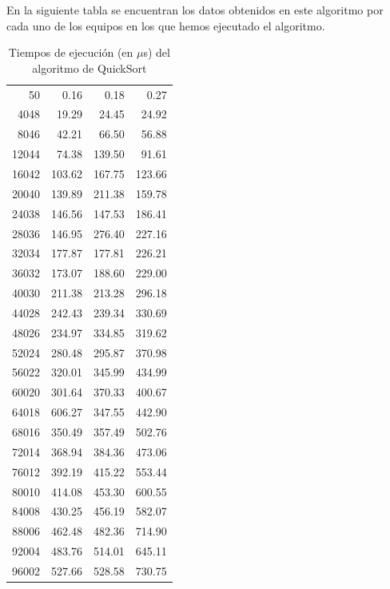 \documentclass{homework}
\begin{document}
    En la siguiente tabla se encuentran los datos obtenidos en este algoritmo por cada uno de los
    equipos en los que hemos ejecutado el algoritmo. 

    \begin{table}[h]
        \centering
            \begin{tabular}{|r|r|r|r|}
                50 & 0.16 & 0.18 & 0.27 \\ 
                4048 & 19.29 & 24.45 & 24.92 \\ 
                8046 & 42.21 & 66.50 & 56.88 \\ 
                12044 & 74.38 & 139.50 & 91.61 \\ 
                16042 & 103.62 & 167.75 & 123.66 \\ 
                20040 & 139.89 & 211.38 & 159.78 \\ 
                24038 & 146.56 & 147.53 & 186.41 \\ 
                28036 & 146.95 & 276.40 & 227.16 \\ 
                32034 & 177.87 & 177.81 & 226.21 \\ 
                36032 & 173.07 & 188.60 & 229.00 \\ 
                40030 & 211.38 & 213.28 & 296.18 \\ 
                44028 & 242.43 & 239.34 & 330.69 \\ 
                48026 & 234.97 & 334.85 & 319.62 \\ 
                52024 & 280.48 & 295.87 & 370.98 \\ 
                56022 & 320.01 & 345.99 & 434.99 \\ 
                60020 & 301.64 & 370.33 & 400.67 \\ 
                64018 & 606.27 & 347.55 & 442.90 \\ 
                68016 & 350.49 & 357.49 & 502.76 \\ 
                72014 & 368.94 & 384.36 & 473.06 \\ 
                76012 & 392.19 & 415.22 & 553.44 \\ 
                80010 & 414.08 & 453.30 & 600.55 \\ 
                84008 & 430.25 & 456.19 & 582.07 \\ 
                88006 & 462.48 & 482.36 & 714.90 \\ 
                92004 & 483.76 & 514.01 & 645.11 \\ 
                96002 & 527.66 & 528.58 & 730.75 \\ 
            \end{tabular}
        \caption{Tiempos de ejecución (en $\mu$s) del algoritmo de QuickSort}
    \end{table}
\end{document}
